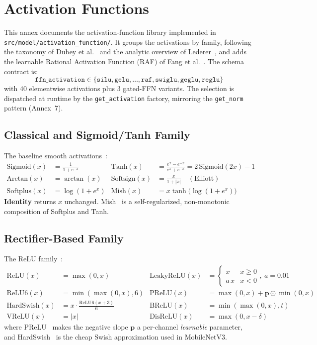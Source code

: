 \section{Activation Functions}
\label{sec:annex-activation-functions}

This annex documents the activation-function library implemented in
\texttt{src/model/activation\_function/}. It groups the activations by family,
following the taxonomy of Dubey et al.~\citep{dubey2021activations} and the
analytic overview of Lederer~\citep{lederer2021activations}, and adds the
learnable Rational Activation Function (RAF) of Fang et
al.~\citep{fang2023raft}. The schema contract is:
\[
\texttt{ffn\_activation} \in \{\texttt{silu}, \texttt{gelu}, \dots, \texttt{raf}, \texttt{swiglu}, \texttt{geglu}, \texttt{reglu}\}
\]
with 40 elementwise activations plus 3 gated-FFN variants. The selection is
dispatched at runtime by the \texttt{get\_activation} factory, mirroring the
\texttt{get\_norm} pattern (Annex~7).

\subsection{Classical and Sigmoid/Tanh Family}

The baseline smooth activations~\citep{lederer2021activations,dubey2021activations}:
\begin{align*}
\text{Sigmoid}(x) &= \frac{1}{1+e^{-x}} & \text{Tanh}(x) &= \frac{e^{x}-e^{-x}}{e^{x}+e^{-x}} = 2\,\text{Sigmoid}(2x)-1 \\
\text{Arctan}(x) &= \arctan(x) & \text{Softsign}(x) &= \frac{x}{1+|x|} \quad (\text{Elliott}) \\
\text{Softplus}(x) &= \log(1+e^{x}) & \text{Mish}(x) &= x\tanh\!\big(\log(1+e^{x})\big)
\end{align*}
\textbf{Identity} returns $x$ unchanged. Mish~\citep{misra2019mish} is a
self-regularized, non-monotonic composition of Softplus and Tanh.

\subsection{Rectifier-Based Family}

The ReLU family~\citep{nair2010relu,dubey2021activations}:
\begin{align*}
\text{ReLU}(x) &= \max(0,x) & \text{LeakyReLU}(x) &= \begin{cases} x & x\ge0 \\ a\,x & x<0 \end{cases},\ a=0.01 \\
\text{ReLU6}(x) &= \min(\max(0,x),6) & \text{PReLU}(x) &= \max(0,x)+\mathbf{p}\odot\min(0,x) \\
\text{HardSwish}(x) &= x\cdot\frac{\text{ReLU6}(x+3)}{6} & \text{BReLU}(x) &= \min(\max(0,x),t) \\
\text{VReLU}(x) &= |x| & \text{DisReLU}(x) &= \max(0,x-\delta)
\end{align*}
where PReLU~\citep{he2015prelu} makes the negative slope $\mathbf{p}$ a
per-channel \emph{learnable} parameter, and HardSwish~\citep{howard2019hardswish}
is the cheap Swish approximation used in MobileNetV3.

